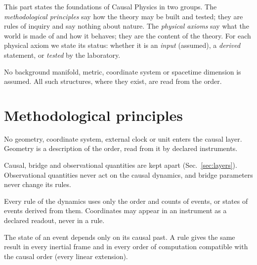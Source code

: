 
This part states the foundations of Causal Physics in two groups. The \emph{methodological
principles} say how the theory may be built and tested; they are rules of inquiry and say nothing
about nature. The \emph{physical axioms} say what the world is made of and how it behaves; they are
the content of the theory. For each physical axiom we state its status: whether it is an
\emph{input} (assumed), a \emph{derived} statement, or \emph{tested} by the laboratory.

No background manifold, metric, coordinate system or spacetime dimension is assumed. All such
structures, where they exist, are read from the order.

\section{Methodological principles}\label{sec:method-ax}

\begin{definition}
No geometry, coordinate system, external clock or unit enters the causal layer. Geometry is a
description of the order, read from it by declared instruments.
\end{definition}

\begin{definition}
Causal, bridge and observational quantities are kept apart (Sec.~\ref{sec:layers}). Observational
quantities never act on the causal dynamics, and bridge parameters never change its rules.
\end{definition}

\begin{definition}
Every rule of the dynamics uses only the order and counts of events, or states of events derived
from them. Coordinates may appear in an instrument as a declared readout, never in a rule.
\end{definition}

\begin{definition}
The state of an event depends only on its causal past. A rule gives the same result in every
inertial frame and in every order of computation compatible with the causal order (every linear
extension).
\end{definition}

